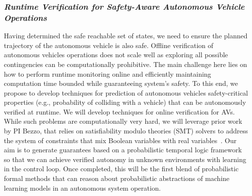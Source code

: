 \subsubsection{\em Runtime Verification for Safety-Aware Autonomous Vehicle Operations}
\label{subsec:runtime}
Having determined the safe reachable set of states, we need to ensure the planned trajectory of the autonomous vehicle is also safe. 
Offline verification of autonomous vehicles operations does not scale well as exploring all possible contingencies can be computationally prohibitive. 
The main challenge here lies on how to perform runtime monitoring online and efficiently maintaining computation time bounded while guaranteeing system's safety.  To this end, we propose to develop techniques for prediction of autonomous vehicles safety-critical properties (e.g., probability of colliding with a vehicle) that can be autonomously verified at runtime.  
We will develop techniques for online verification for AVs. While such problems are computationally very hard, we will leverage prior work by PI Bezzo, that relies on satisfiability modulo theories (SMT) solvers to address the system of constraints that mix Boolean variables with real variables~\cite{shoukry2015secure, bezzo2015idetc}. 
Our aim is to generate guarantees based on a probabilistic temporal logic framework so that we can achieve verified autonomy in unknown environments with learning in the control loop.  Once completed, this will be the first blend of probabilistic formal methods that can reason about probabilistic abstractions of machine learning models in an autonomous system operation.  
